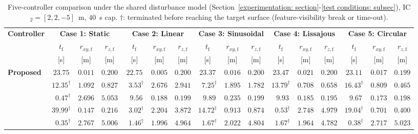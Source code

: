 \begin{table}[!t]
\centering
\caption{Five-controller comparison under the shared disturbance model (Section~\ref{experimentation: section}-\ref{test conditions: subsec}), IC$_2=[2,2,-5]$~m, $40$~s cap. $\dagger$: terminated before reaching the target surface (feature-visibility break or time-out).}
\label{comparison: table}
\footnotesize
\setlength{\tabcolsep}{3.5pt}
\begin{tabular}{lccc@{\hskip 6pt}ccc@{\hskip 6pt}ccc@{\hskip 6pt}ccc@{\hskip 6pt}ccc}
\toprule
\multirow{3}{*}{\textbf{Controller}}
    & \multicolumn{3}{c}{\textbf{Case 1: Static}}
    & \multicolumn{3}{c}{\textbf{Case 2: Linear}}
    & \multicolumn{3}{c}{\textbf{Case 3: Sinusoidal}}
    & \multicolumn{3}{c}{\textbf{Case 4: Lissajous}}
    & \multicolumn{3}{c}{\textbf{Case 5: Circular}} \\
\cmidrule(lr){2-4}\cmidrule(lr){5-7}\cmidrule(lr){8-10}\cmidrule(lr){11-13}\cmidrule(lr){14-16}
    & $t_\text{f}$ & $r_{xy,\text{f}}$ & $r_{z,\text{f}}$
    & $t_\text{f}$ & $r_{xy,\text{f}}$ & $r_{z,\text{f}}$
    & $t_\text{f}$ & $r_{xy,\text{f}}$ & $r_{z,\text{f}}$
    & $t_\text{f}$ & $r_{xy,\text{f}}$ & $r_{z,\text{f}}$
    & $t_\text{f}$ & $r_{xy,\text{f}}$ & $r_{z,\text{f}}$ \\
    & [s] & [m] & [m]
    & [s] & [m] & [m]
    & [s] & [m] & [m]
    & [s] & [m] & [m]
    & [s] & [m] & [m] \\
\midrule
\textbf{Proposed}
    & $\mathbf{23.75}$           & $\mathbf{0.011}$ & $0.200$
    & $\mathbf{22.75}$           & $\mathbf{0.005}$ & $0.200$
    & $\mathbf{23.37}$           & $\mathbf{0.016}$ & $0.200$
    & $\mathbf{23.47}$           & $\mathbf{0.021}$ & $0.200$
    & $\mathbf{23.11}$           & $\mathbf{0.017}$ & $0.199$ \\
\cite{lin2022}
    & $12.35^\dagger$            & $1.092$ & $0.827$
    & $\phantom{0}3.53^\dagger$  & $2.676$ & $2.941$
    & $\phantom{0}7.25^\dagger$  & $1.895$ & $1.782$
    & $13.79^\dagger$            & $0.708$ & $0.658$
    & $16.43^\dagger$            & $0.809$ & $0.465$ \\
\cite{zhang2026}
    & $\phantom{0}0.47^\dagger$  & $2.696$ & $5.053$
    & $\phantom{0}9.56$          & $0.188$ & $0.199$
    & $\phantom{0}9.89$          & $0.235$ & $0.199$
    & $\phantom{0}9.93$          & $0.185$ & $0.195$
    & $\phantom{0}9.67$          & $0.173$ & $0.198$ \\
\cite{lin2023}
    & $39.99^\dagger$            & $0.147$ & $0.216$
    & $\phantom{0}3.02^\dagger$  & $2.204$ & $3.872$
    & $14.72^\dagger$            & $0.913$ & $0.874$
    & $\phantom{0}0.53^\dagger$  & $2.748$ & $4.979$
    & $19.04^\dagger$            & $0.701$ & $0.400$ \\
\cite{cho2022}
    & $\phantom{0}0.35^\dagger$  & $2.767$ & $5.006$
    & $\phantom{0}1.46^\dagger$  & $1.996$ & $4.964$
    & $\phantom{0}1.67^\dagger$  & $2.022$ & $4.804$
    & $\phantom{0}1.67^\dagger$  & $1.964$ & $4.782$
    & $\phantom{0}0.38^\dagger$  & $2.717$ & $5.023$ \\
\bottomrule
\end{tabular}
\end{table}

